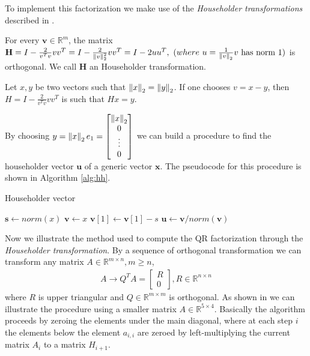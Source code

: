 To implement this factorization we make use of the \textit{Householder transformations} described in \parencite[Chap. 4.2.2]{elden}.

\begin{lemma}
For every $\mathbf{v}\in \mathbb{R}^m$, the matrix $\mathbf{H} = I - \frac{2}{v^Tv}vv^T = I - \frac{2}{\left\lVert v \right\rVert_2^2}vv^T
 = I - 2uu^T,\ (where\ u=\frac{1}{\left\lVert v \right\rVert_2}v\text{ has norm 1})$ is orthogonal. We call $\mathbf{H}$ an Householder transformation.
\end{lemma}
\begin{lemma}
Let $x, y$ be two vectors such that $\left\lVert x \right\rVert_2 = \left\lVert y \right\rVert_2$. If one chooses $v=x-y$, then $H = I - \frac{2}{v^Tv}vv^T$ is such that $Hx = y$.
\end{lemma}
By choosing $y = \left\lVert x \right\rVert_2e_1 = \begin{bmatrix}\left\lVert x \right\rVert_2\\0\\ \vdots \\0\end{bmatrix}$ we can build a procedure to find the householder vector $\textbf{u}$ of a generic vector $\textbf{x}$. The pseudocode for this procedure is shown in Algorithm \ref{alg:hh}.
\begin{algorithm}[H]
	\caption{Householder vector}
	\label{alg:hh}
	\begin{algorithmic}[1]
		\State $\mathbf{s} \leftarrow norm(x)$
		\State $\mathbf{v} \leftarrow x$
		\State $\mathbf{v}[1] \leftarrow \mathbf{v}[1] - s$
		\State $\mathbf{u} \leftarrow \mathbf{v} / norm(\mathbf{v})$
	\end{algorithmic}
\end{algorithm}
Now we illustrate the method used to compute the QR factorization through the \textit{Householder transformation}. By a sequence of orthogonal transformation we can transform any matrix ${A\in \mathbb{R}^{m\times n}, m\geq n}$,
\begin{align*}
    A \to Q^TA = \begin{bmatrix}R \\ 0\end{bmatrix}, R \in \mathbb{R}^{n\times n}
\end{align*}
where $R$ is upper triangular and $Q\in \mathbb{R}^{m\times m}$ is orthogonal. As shown in \parencite[Chap. 5.1]{elden} we can illustrate the procedure using a smaller matrix $A\in \mathbb{R}^{5\times 4}$. Basically the algorithm proceeds by zeroing the elements under the main diagonal, where at each step $i$ the elements below the element $a_{i,i}$ are zeroed by left-multiplying the current matrix $A_i$ to a matrix $H_{i+1}$.

